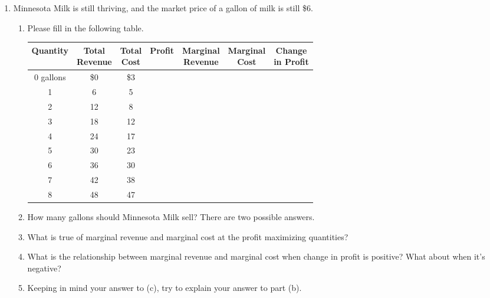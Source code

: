 \documentclass{article}
\begin{document}
\begin{enumerate}

\item Minnesota Milk is still thriving, and the market price of a gallon of milk is still \$6. 

	\begin{enumerate}
	
	\item Please fill in the following table.
	
		\begin{center}
		\begin{tabular}{c | c | c | c | c | c | c}
		Quantity & \makecell{Total\\Revenue} & \makecell{Total\\Cost} & Profit & \makecell{Marginal\\Revenue} & \makecell{Marginal\\Cost} & \makecell{Change\\in Profit} \\
		\hline
		0 gallons & \$0 & \$3 & & & & \\
		\hline
		1 & 6 & 5 & & & & \\
		\hline
		2 & 12 & 8 & & & & \\
		\hline
		3 & 18 & 12 & & & & \\
		\hline
		4 & 24 & 17 & & & & \\
		\hline
		5 & 30 & 23 & & & & \\
		\hline
		6 & 36 & 30 & & & & \\
		\hline
		7 & 42 & 38 & & & & \\
		\hline
		8 & 48 & 47 & & & &
		\end{tabular}
		\end{center}
		
	\item How many gallons should Minnesota Milk sell? There are two possible answers.
	
	\item What is true of marginal revenue and marginal cost at the profit maximizing quantities?
	
	\item What is the relationship between marginal revenue and marginal cost when change in profit is positive? What about when it's negative?
	
	\item Keeping in mind your answer to (c), try to explain your answer to part (b).
	
	\end{enumerate}
	

\end{enumerate}
\end{document}
